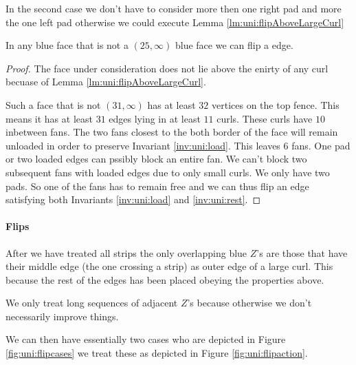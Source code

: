 In the second case we don't have to consider more then one right pad and more the one left pad otherwise we could execute Lemma \ref{lm:uni:flipAboveLargeCurl}

\begin{lemma}
  \label{lm:}
  In any blue face that is not a $(25, \infty)$ blue face  we can flip a edge.
\end{lemma}
\begin{proof}
  The face under consideration does not lie above the enirty of any curl becuase of Lemma \ref{lm:uni:flipAboveLargeCurl}.

  Such a face that is not $(31, \infty)$ has at least $32$ vertices on the top fence. This means it has at least $31$ edges lying in at least $11$ curls. These curls have $10$ inbetween fans. The two fans  closest to the both border of the face will remain unloaded in order to preserve Invariant \ref{inv:uni:load}. This leaves $6$ fans. One pad or two loaded edges can pssibly block an entire fan. We can't block two subsequent fans with loaded edges due to only small curls. We only have two pads. So one of the fans has to remain free and we can thus flip an edge satisfying both Invariants \ref{inv:uni:load} and \ref{inv:uni:rest}.
\end{proof}


\paragraph{Flips}
After we have treated all strips the only overlapping blue $Z$'s are those that have their middle  edge (the one crossing a strip) as outer edge of a large curl. This because the rest of the edges has been placed obeying the properties above.


We only treat long sequences of adjacent $Z$'s  because otherwise we don't necessarily improve things.


We can then have essentially two cases
who are depicted in Figure \ref{fig:uni:flipcases} we treat these as depicted in Figure \ref{fig:uni:flipaction}.


